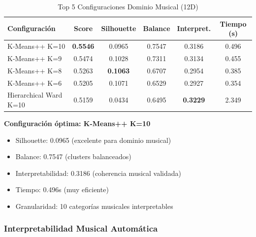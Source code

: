 \documentclass[12pt,a4paper]{article}
\begin{document}
\begin{table}[H]
\centering
\caption{Top 5 Configuraciones Dominio Musical (12D)}
\begin{tabular}{|l|c|c|c|c|c|}
\hline
\textbf{Configuración} & \textbf{Score} & \textbf{Silhouette} & \textbf{Balance} & \textbf{Interpret.} & \textbf{Tiempo (s)} \\
\hline
K-Means++ K=10 & \textbf{0.5546} & 0.0965 & 0.7547 & 0.3186 & 0.496 \\
\hline
K-Means++ K=9 & 0.5474 & 0.1028 & 0.7311 & 0.3134 & 0.455 \\
\hline
K-Means++ K=8 & 0.5263 & \textbf{0.1063} & 0.6707 & 0.2954 & 0.385 \\
\hline
K-Means++ K=6 & 0.5205 & 0.1071 & 0.6529 & 0.2927 & 0.354 \\
\hline
Hierarchical Ward K=10 & 0.5159 & 0.0434 & 0.6495 & \textbf{0.3229} & 2.349 \\
\hline
\end{tabular}
\end{table}

\textbf{Configuración óptima: K-Means++ K=10}
\begin{itemize}
    \item Silhouette: 0.0965 (excelente para dominio musical)
    \item Balance: 0.7547 (clusters balanceados)
    \item Interpretabilidad: 0.3186 (coherencia musical validada)
    \item Tiempo: 0.496s (muy eficiente)
    \item Granularidad: 10 categorías musicales interpretables
\end{itemize}

\subsubsection{Interpretabilidad Musical Automática}
\end{document}
